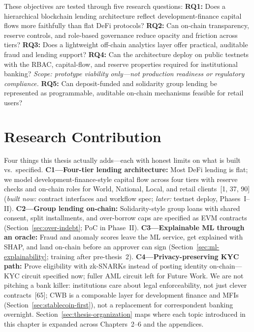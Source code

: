 \documentclass[12pt, a4paper]{report}
\begin{document}
\noindent These objectives are tested through five research questions: \textbf{RQ1:} Does a hierarchical blockchain lending architecture reflect development-finance capital flows more faithfully than flat DeFi protocols? \textbf{RQ2:} Can on-chain transparency, reserve controls, and role-based governance reduce opacity and friction across tiers? \textbf{RQ3:} Does a lightweight off-chain analytics layer offer practical, auditable fraud and lending support? \textbf{RQ4:} Can the architecture deploy on public testnets with the RBAC, capital-flow, and reserve properties required for institutional banking? \textit{Scope: prototype viability only---not production readiness or regulatory compliance.} \textbf{RQ5:} Can deposit-funded and solidarity group lending be represented as programmable, auditable on-chain mechanisms feasible for retail users?

\section{Research Contribution}
\label{sec:research-contribution}

Four things this thesis actually adds---each with honest limits on what is built vs.\ specified. \textbf{C1---Four-tier lending architecture:} Most DeFi lending is flat; we model development-finance-style capital flow across four tiers with reserve checks and on-chain roles for World, National, Local, and retail clients~[1, 37, 90] (\textit{built now:} contract interfaces and workflow spec; \textit{later:} testnet deploy, Phases~I--II). \textbf{C2---Group lending on-chain:} Solidarity-style group loans with shared consent, split installments, and over-borrow caps are specified as EVM contracts (Section~\ref{sec:over-indebt}; PoC in Phase~II). \textbf{C3---Explainable ML through an oracle:} Fraud and anomaly scores leave the ML service, get explained with SHAP, and land on-chain before an approver can sign (Section~\ref{sec:ml-explainability}; training after pre-thesis~2). \textbf{C4---Privacy-preserving KYC path:} Prove eligibility with zk-SNARKs instead of posting identity on-chain---KYC circuit specified now; fuller AML circuit left for Future Work. We are not pitching a bank killer: institutions care about legal enforceability, not just clever contracts~[65]; CWB is a composable layer for development finance and MFIs (Section~\ref{sec:stablecoin-first}), not a replacement for correspondent banking overnight. Section~\ref{sec:thesis-organization} maps where each topic introduced in this chapter is expanded across Chapters~2--6 and the appendices.
\end{document}
